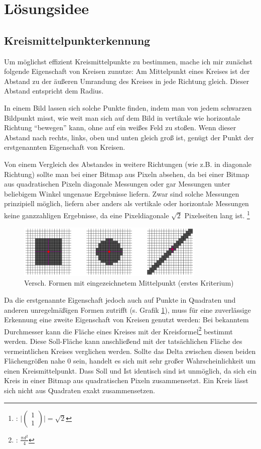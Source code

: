 \section{Lösungsidee}
\subsection{Kreismittelpunkterkennung}
Um möglichst effizient Kreismittelpunkte zu bestimmen, mache ich mir zunächst folgende Eigenschaft von Kreisen zunutze: Am Mittelpunkt eines Kreises ist der Abstand zu der äußeren Umrandung des Kreises in jede Richtung gleich. Dieser Abstand entspricht dem Radius.

In einem Bild lassen sich solche Punkte finden, indem man von jedem schwarzen Bildpunkt misst, wie weit man sich auf dem Bild in vertikale wie horizontale Richtung "`bewegen"' kann, ohne auf ein weißes Feld zu stoßen. Wenn dieser Abstand nach rechts, links, oben und unten gleich groß ist, genügt der Punkt der erstgenannten Eigenschaft von Kreisen. 

Von einem Vergleich des Abstandes in weitere Richtungen (wie z.B. in diagonale Richtung) sollte man bei einer Bitmap aus Pixeln absehen, da bei einer Bitmap aus quadratischen Pixeln diagonale Messungen oder gar Messungen unter beliebigem Winkel ungenaue Ergebnisse liefern. 
Zwar sind solche Messungen prinzipiell möglich, liefern aber anders als vertikale oder horizontale Messungen keine ganzzahligen Ergebnisse, da eine Pixeldiagonale \(\sqrt{2}\) Pixelseiten lang ist.
\footnote{: \( \vert \begin{pmatrix}1\\1\end{pmatrix} \vert = \sqrt{2}\)}

\begin{figure}[!ht]
	\centering	
	\includegraphics[width=0.8\textwidth]{Grafiken/durchmesservergleich}
	\caption{Versch. Formen mit eingezeichnetem Mittelpunkt (erstes Kriterium)}
	\label{abb:mischformen}
\end{figure}

Da die erstgenannte Eigenschaft jedoch auch auf Punkte in Quadraten und anderen unregelmäßigen Formen zutrifft (s. Grafik \ref{abb:mischformen}), muss für eine zuverlässige Erkennung eine zweite Eigenschaft von Kreisen genutzt werden: Bei bekanntem Durchmesser kann die Fläche eines Kreises mit der Kreisformel\footnote{: \(\frac{\pi d^2}{4}\)} bestimmt werden.
Diese Soll-Fläche kann anschließend mit der tatsächlichen Fläche des vermeintlichen Kreises verglichen werden. Sollte das Delta zwischen diesen beiden Flächengrößen nahe 0 sein, handelt es sich mit sehr großer Wahrscheinlichkeit um einen Kreismittelpunkt. 
Dass Soll und Ist identisch sind ist unmöglich, da sich ein Kreis in einer Bitmap aus quadratischen Pixeln zusammensetzt. Ein Kreis lässt sich nicht aus Quadraten exakt zusammensetzen.

